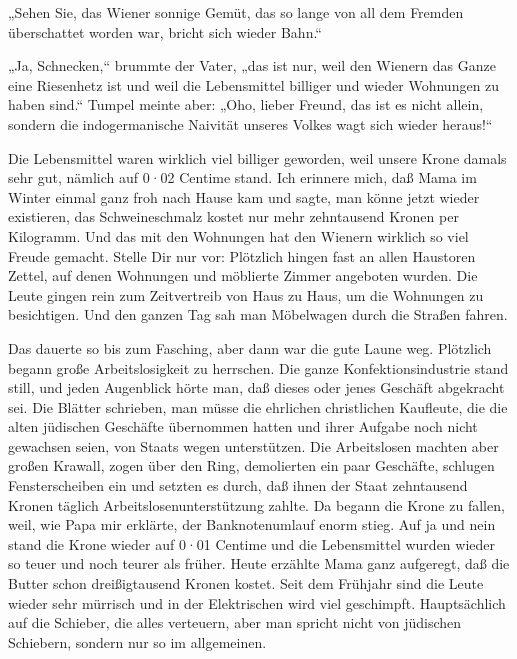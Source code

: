 „Sehen Sie, das Wiener sonnige Gemüt, das so lange von all dem
Fremden überschattet worden war, bricht sich wieder Bahn.“

„Ja, Schnecken,“ brummte der Vater, „das ist nur, weil den Wienern
das Ganze eine Riesenhetz ist und weil die Lebensmittel billiger
und wieder Wohnungen zu haben sind.“ Tumpel meinte aber: „Oho,
lieber Freund, das ist es nicht allein, sondern die indogermanische
Naivität unseres Volkes wagt sich wieder heraus!“

Die Lebensmittel waren wirklich viel billiger geworden, weil unsere
Krone damals sehr gut, nämlich auf 0·02 Centime stand. Ich erinnere
mich, daß Mama im Winter einmal ganz froh nach Hause kam und sagte,
man könne jetzt wieder existieren, das Schweineschmalz kostet nur
mehr zehntausend Kronen per Kilogramm. Und das mit den
 Wohnungen hat den Wienern wirklich so viel Freude
gemacht. Stelle Dir nur vor: Plötzlich hingen fast an allen
Haustoren Zettel, auf denen Wohnungen und möblierte Zimmer
angeboten wurden. Die Leute gingen rein zum Zeitvertreib von Haus
zu Haus, um die Wohnungen zu besichtigen. Und den ganzen Tag sah
man Möbelwagen durch die Straßen fahren.

Das dauerte so bis zum Fasching, aber dann war die gute Laune weg.
Plötzlich begann große Arbeitslosigkeit zu herrschen. Die ganze
Konfektionsindustrie stand still, und jeden Augenblick hörte man,
daß dieses oder jenes Geschäft abgekracht sei. Die Blätter
schrieben, man müsse die ehrlichen christlichen Kaufleute, die die
alten jüdischen Geschäfte übernommen hatten und ihrer Aufgabe noch
nicht gewachsen seien, von Staats wegen unterstützen. Die
Arbeitslosen machten aber großen Krawall, zogen über den Ring,
demolierten ein paar Geschäfte, schlugen Fensterscheiben ein und
setzten es durch, daß ihnen der Staat zehntausend Kronen täglich
Arbeitslosenunterstützung zahlte. Da begann die Krone zu fallen,
weil, wie Papa mir erklärte, der Banknotenumlauf enorm stieg. Auf
ja und nein stand die Krone wieder auf 0·01 Centime und die
Lebensmittel wurden wieder so teuer und noch teurer als früher.
Heute erzählte Mama ganz aufgeregt, daß die Butter schon
dreißigtausend Kronen kostet. Seit dem Frühjahr sind die Leute
wieder sehr mürrisch und in der Elektrischen wird viel geschimpft.
Hauptsächlich auf die Schieber, die alles verteuern, aber man
spricht nicht von jüdischen Schiebern, sondern nur so im
allgemeinen.

